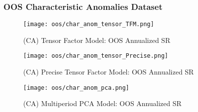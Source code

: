 \subsubsection{OOS Characteristic Anomalies Dataset}

\begin{figure}[H]
    \centering
    \texttt{[image: oos/char\_anom\_tensor\_TFM.png]}
    \caption{(CA) Tensor Factor Model: OOS Annualized SR}
    \label{fig:char_anom-oos-tfm}
\end{figure}

\begin{figure}[H]
    \centering
    \texttt{[image: oos/char\_anom\_tensor\_Precise.png]}
    \caption{(CA) Precise Tensor Factor Model: OOS Annualized SR}
    \label{fig:char_anom-oos-precise}
\end{figure}


\begin{figure}[H]
    \centering
    \texttt{[image: oos/char\_anom\_pca.png]}
    \caption{(CA) Multiperiod PCA Model: OOS Annualized SR}
    \label{fig:char_anom-oos-pca}
\end{figure}
